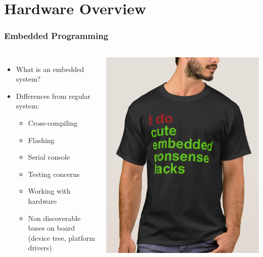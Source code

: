 \documentclass[aspectratio=169]{beamer}
\begin{document}
\section{Hardware Overview}

\begin{frame}
  \frametitle{Embedded Programming}
  \begin{columns}
      \begin{itemize}
        \item What is an embedded system?
        \item Differences from regular system:
        \begin{itemize}
          \item Cross-compiling
          \item Flashing
          \item Serial console
          \item Testing concerns
          \item Working with hardware
          \item Non discoverable buses on board (device tree, platform drivers)
        \end{itemize}
      \end{itemize}
      \includegraphics[scale=0.25]{images/embedded.jpg}
  \end{columns}
\end{frame}
\end{document}

